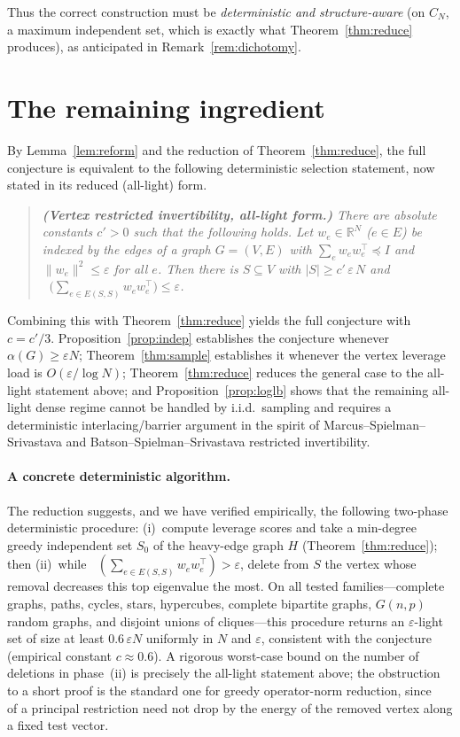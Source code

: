 \documentclass[12pt]{article}
\DeclareMathOperator*{\lammax}{\lambda_{\max}}
\newcommand{\bR}{\mathbb{R}}
\newcommand{\eps}{\varepsilon}
\theoremstyle{definition}
\begin{document}
Thus the correct construction must be \emph{deterministic and structure-aware}
(on $C_N$, a maximum independent set, which is exactly what
Theorem~\ref{thm:reduce} produces), as anticipated in
Remark~\ref{rem:dichotomy}.

\section{The remaining ingredient}\label{sec:remaining}

By Lemma~\ref{lem:reform} and the reduction of Theorem~\ref{thm:reduce}, the full
conjecture is equivalent to the following deterministic selection statement, now
stated in its reduced (all-light) form.

\begin{quote}\itshape
\textbf{(Vertex restricted invertibility, all-light form.)} There are absolute
constants $c'>0$ such that the following holds. Let $w_e\in\bR^N$ ($e\in E$) be
indexed by the edges of a graph $G=(V,E)$ with $\sum_e w_ew_e^{\top}\preceq I$ and
$\|w_e\|^2\le\eps$ for all $e$. Then there is $S\subseteq V$ with
$|S|\ge c'\,\eps\,N$ and
$\lammax\big(\sum_{e\in E(S,S)}w_ew_e^{\top}\big)\le\eps$.
\end{quote}

\noindent
Combining this with Theorem~\ref{thm:reduce} yields the full conjecture with
$c=c'/3$. Proposition~\ref{prop:indep} establishes the conjecture whenever
$\alpha(G)\ge\eps N$; Theorem~\ref{thm:sample} establishes it whenever the vertex
leverage load is $O(\eps/\log N)$; Theorem~\ref{thm:reduce} reduces the general
case to the all-light statement above; and Proposition~\ref{prop:loglb} shows that
the remaining all-light dense regime cannot be handled by i.i.d.\ sampling and
requires a deterministic interlacing/barrier argument in the spirit of
Marcus--Spielman--Srivastava and Batson--Spielman--Srivastava restricted
invertibility.

\paragraph{A concrete deterministic algorithm.}
The reduction suggests, and we have verified empirically, the following two-phase
deterministic procedure: (i)~compute leverage scores and take a min-degree greedy
independent set $S_0$ of the heavy-edge graph $H$ (Theorem~\ref{thm:reduce}); then
(ii)~while $\lammax(\sum_{e\in E(S,S)}w_ew_e^{\top})>\eps$, delete from $S$ the
vertex whose removal decreases this top eigenvalue the most. On all tested
families---complete graphs, paths, cycles, stars, hypercubes, complete bipartite
graphs, $G(n,p)$ random graphs, and disjoint unions of cliques---this procedure
returns an $\eps$-light set of size at least $0.6\,\eps N$ uniformly in $N$ and
$\eps$, consistent with the conjecture (empirical constant $c\approx0.6$). A
rigorous worst-case bound on the number of deletions in phase~(ii) is precisely
the all-light statement above; the obstruction to a short proof is the standard
one for greedy operator-norm reduction, since $\lammax$ of a principal restriction
need not drop by the energy of the removed vertex along a fixed test vector.
\end{document}
